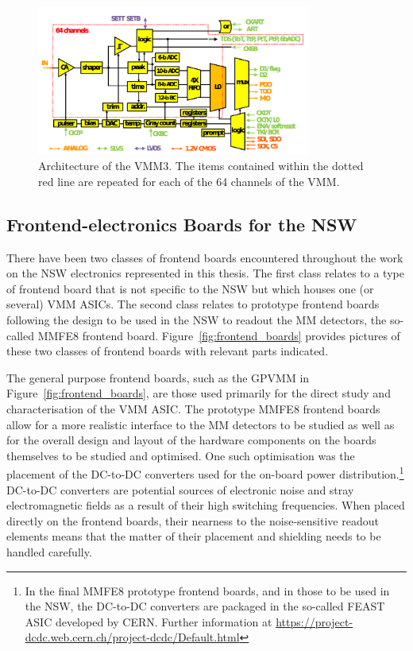 \begin{figure}[!htb]
    \begin{center}
        \includegraphics[width=0.8\textwidth]{figures/nsw/vmm/vmm3_channel}
        \caption{
            Architecture of the VMM3.
            The items contained within the dotted red line are repeated
            for each of the 64 channels of the VMM.
        }
        \label{fig:vmm3_channel}
    \end{center}
\end{figure}

\subsection{Frontend-electronics Boards for the NSW}
\label{sec:nsw_boards}

There have been two classes of frontend boards encountered
throughout the work on the NSW electronics represented in this thesis.
The first class relates to a type of frontend board that is not specific to the NSW
but which houses one (or several) VMM ASICs.
The second class relates to prototype frontend boards following the design to be used
in the NSW to readout the MM detectors, the so-called MMFE8 frontend board.
Figure~\ref{fig:frontend_boards} provides pictures of these two classes of frontend
boards with relevant parts indicated.

The general purpose frontend boards, such as the GPVMM in Figure~\ref{fig:frontend_boards}, are those used primarily for the direct study
and characterisation of the VMM ASIC.
The prototype MMFE8 frontend boards allow for a more realistic interface to the MM
detectors to be studied as well as for the overall design and layout of the hardware components on the
boards themselves to be studied and optimised.
One such optimisation was the placement of the DC-to-DC converters used for the on-board power distribution.\footnote{In the
final MMFE8 prototype frontend boards, and in those to be used in the NSW,
the DC-to-DC converters are packaged in the so-called FEAST ASIC developed by CERN.
Further information at \url{https://project-dcdc.web.cern.ch/project-dcdc/Default.html}}
DC-to-DC converters are potential sources of electronic noise and stray electromagnetic fields as a result of
their high switching frequencies.
When placed directly on the frontend boards, their nearness to the noise-sensitive readout
elements means that the matter of their placement and shielding needs to be handled carefully.


